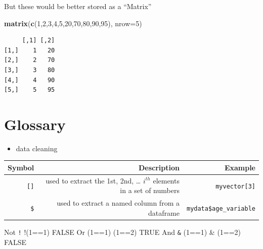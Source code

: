 \documentclass[]{book}
\newenvironment{Shaded}{\begin{snugshade}}{\end{snugshade}}
\newcommand{\DataTypeTok}[1]{\textcolor[rgb]{0.13,0.29,0.53}{#1}}
\newcommand{\DecValTok}[1]{\textcolor[rgb]{0.00,0.00,0.81}{#1}}
\newcommand{\KeywordTok}[1]{\textcolor[rgb]{0.13,0.29,0.53}{\textbf{#1}}}
\newcommand{\NormalTok}[1]{#1}
\providecommand{\tightlist}{%
  \setlength{\itemsep}{0pt}\setlength{\parskip}{0pt}}
\begin{document}
But these would be better stored as a ``Matrix''

\begin{Shaded}
\begin{Highlighting}[]
\KeywordTok{matrix}\NormalTok{(}\KeywordTok{c}\NormalTok{(}\DecValTok{1}\NormalTok{,}\DecValTok{2}\NormalTok{,}\DecValTok{3}\NormalTok{,}\DecValTok{4}\NormalTok{,}\DecValTok{5}\NormalTok{,}\DecValTok{20}\NormalTok{,}\DecValTok{70}\NormalTok{,}\DecValTok{80}\NormalTok{,}\DecValTok{90}\NormalTok{,}\DecValTok{95}\NormalTok{), }\DataTypeTok{nrow=}\DecValTok{5}\NormalTok{)}
\end{Highlighting}
\end{Shaded}

\begin{verbatim}
     [,1] [,2]
[1,]    1   20
[2,]    2   70
[3,]    3   80
[4,]    4   90
[5,]    5   95
\end{verbatim}

\hypertarget{glossary-1}{%
\section{Glossary}\label{glossary-1}}

\begin{itemize}
\tightlist
\item
  data cleaning
\end{itemize}

\begin{longtable}[]{@{}rrr@{}}
\toprule
\begin{minipage}[b]{0.30\columnwidth}\raggedleft
Symbol\strut
\end{minipage} & \begin{minipage}[b]{0.30\columnwidth}\raggedleft
Description\strut
\end{minipage} & \begin{minipage}[b]{0.30\columnwidth}\raggedleft
Example\strut
\end{minipage}\tabularnewline
\midrule
\endhead
\begin{minipage}[t]{0.30\columnwidth}\raggedleft
\texttt{{[}{]}}\strut
\end{minipage} & \begin{minipage}[t]{0.30\columnwidth}\raggedleft
used to extract the 1st, 2nd, \ldots{} \(i^{th}\) elements in a set of numbers\strut
\end{minipage} & \begin{minipage}[t]{0.30\columnwidth}\raggedleft
\texttt{myvector{[}3{]}}\strut
\end{minipage}\tabularnewline
\begin{minipage}[t]{0.30\columnwidth}\raggedleft
\texttt{\$}\strut
\end{minipage} & \begin{minipage}[t]{0.30\columnwidth}\raggedleft
used to extract a named column from a dataframe\strut
\end{minipage} & \begin{minipage}[t]{0.30\columnwidth}\raggedleft
\texttt{mydata\$age\_variable}\strut
\end{minipage}\tabularnewline
\bottomrule
\end{longtable}

Not \textbar{} \texttt{!} \textbar{} !(1==1) \textbar{} FALSE
Or \textbar{} \texttt{\textbar{}} \textbar{} (1==1) \textbar{} (1==2) \textbar{} TRUE
And \textbar{} \texttt{\&} \textbar{} (1==1) \& (1==2) \textbar{} FALSE


\end{document}

